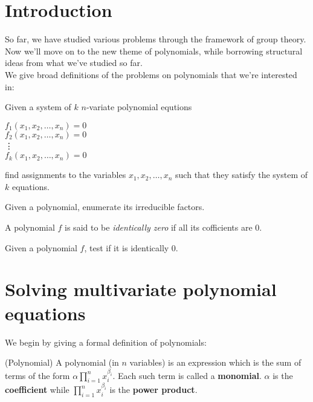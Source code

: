 
\section{Introduction}
So far, we have studied various problems through the framework of group theory. Now we'll move on to the new theme of polynomials, while borrowing structural ideas from what we've studied so far.\\
We give broad definitions of the problems on polynomials that we're interested in:\\

\begin{problem}
Given a system of $k$ $n$-variate polynomial equtions
\begin{center}
$f_1(x_1, x_2, \ldots, x_n) = 0$\\
$f_2(x_1, x_2, \ldots, x_n) = 0$\\
\hspace{20 mm}\vdots \\
$f_k (x_1, x_2, \ldots, x_n) = 0$
\end{center}
find assignments to the variables $x_1, x_2, \ldots, x_n$ such that they satisfy the system of $k$ equations.
\end{problem}

\begin{problem}
Given a polynomial, enumerate its irreducible factors.
\end{problem}

A polynomial $f$ is said to be {\em identically zero} if all its cofficients are 0. 

\begin{problem}
Given a polynomial $f$, test if it is identically 0.
\end{problem}

\section{Solving multivariate polynomial equations}
We begin by giving a formal definition of polynomials:
\begin{definition} (Polynomial)
A polynomial (in $n$ variables) is an expression which is the sum of terms of the form $ \alpha\prod\limits_{i=1}^{n} x_i^{\beta_i}$. Each such term is called a \textbf{monomial}. $\alpha$ is the \textbf{coefficient} while $\prod\limits_{i=1}^{n} x_i^{\beta_i}$ is the \textbf{power product}.
\end{definition}


